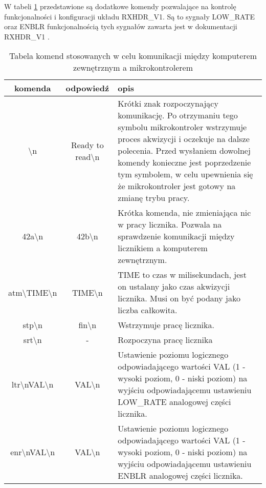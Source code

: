W tabeli \ref{komunikacja} przedstawione są dodatkowe komendy pozwalające na kontrolę funkcjonalności i konfiguracji układu RXHDR\_V1. Są to sygnały LOW\_RATE oraz ENBLR funkcjonalnością tych sygnałów zawarta jest w dokumentacji RXHDR\_V1 \cite{master}.

\begin{table}
        \centering
        \caption{Tabela komend stosowanych w celu komunikacji między komputerem zewnętrznym a mikrokontrolerem}
        \label{komunikacja}
        \begin{tabularx}{\textwidth}{|c|c|X|}
                \hline
                komenda & odpowiedź & opis \\ \hline

                \textbackslash n & Ready to read\textbackslash n & 
                Krótki znak rozpoczynający komunikację.
                Po otrzymaniu tego symbolu mikrokontroler wstrzymuje proces akwizycji i oczekuje na dalsze polecenia.
                Przed wysłaniem dowolnej komendy konieczne jest poprzedzenie tym symbolem, w celu upewnienia się że mikrokontroler jest gotowy na zmianę trybu pracy.
                \\ \hline

                42a\textbackslash n & 42b\textbackslash n& Krótka komenda, nie zmieniająca nic w pracy licznika. Pozwala na sprawdzenie komunikacji między licznikiem a komputerem zewnętrznym. \\ \hline

                atm\textbackslash TIME\textbackslash n & TIME\textbackslash n& TIME to czas w milisekundach, jest on ustalany jako czas akwizycji licznika. Musi on być podany jako liczba całkowita.\\ \hline

                stp\textbackslash n& fin\textbackslash n& Wstrzymuje pracę licznika. \\ \hline

                srt\textbackslash n& - & Rozpoczyna pracę licznika \\ \hline

                ltr\textbackslash nVAL\textbackslash n& VAL\textbackslash n & Ustawienie poziomu logicznego odpowiadającego wartości VAL (1 - wysoki poziom, 0 - niski poziom) na wyjściu odpowiadającemu ustawieniu LOW\_RATE analogowej części licznika. \\ \hline
                
                enr\textbackslash nVAL\textbackslash n& VAL\textbackslash n & Ustawienie poziomu logicznego odpowiadającego wartości VAL (1 - wysoki poziom, 0 - niski poziom) na wyjściu odpowiadającemu ustawieniu ENBLR analogowej części licznika. \\ \hline

        \end{tabularx}
\end{table}

